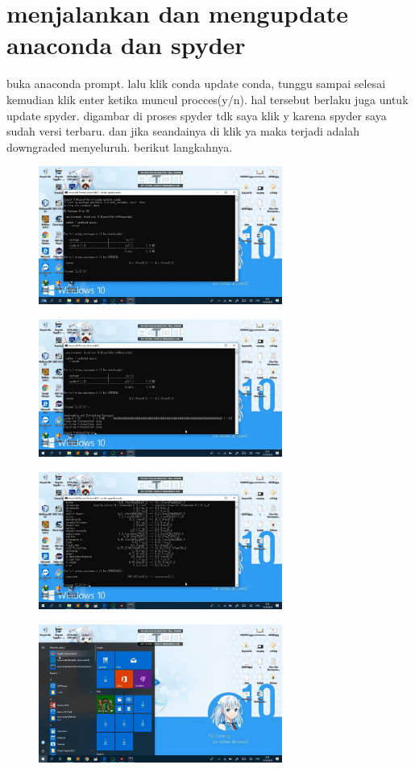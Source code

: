 \section{menjalankan dan mengupdate anaconda dan spyder}
	buka anaconda prompt. lalu klik conda update conda, tunggu sampai selesai kemudian klik enter ketika muncul procces(y/n). hal tersebut berlaku juga untuk update spyder. digambar di proses spyder tdk saya klik y karena spyder saya sudah versi terbaru. dan jika seandainya di klik ya maka terjadi adalah downgraded menyeluruh. berikut langkahnya.
\begin{figure}[H]
	\centering
	\includegraphics[width=8cm]{figures/6-6.jpg}
\end{figure}

\begin{figure}[H]
	\centering
	\includegraphics[width=8cm]{figures/6-7.jpg}
\end{figure}

\begin{figure}[H]
	\centering
	\includegraphics[width=8cm]{figures/6-8.jpg}
\end{figure}

\begin{figure}[H]
	\centering
	\includegraphics[width=8cm]{figures/6-9.jpg}
\end{figure}

